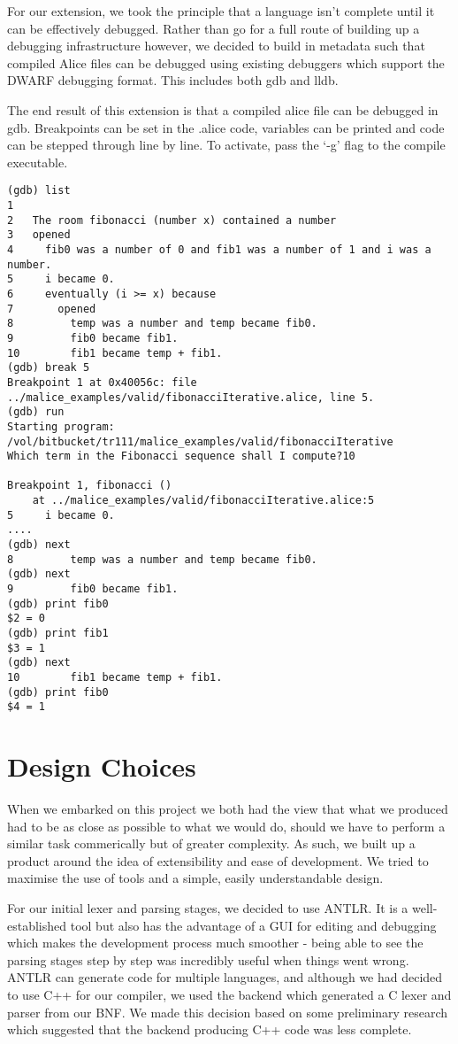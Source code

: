 \documentclass[a4wide, 11pt]{article}
\begin{document}
For our extension, we took the principle that a language isn't complete until it can be effectively debugged. Rather than go for a full route of building up a debugging infrastructure however, we decided to build in metadata such that compiled Alice files can be debugged using existing debuggers which support the DWARF debugging format. This includes both gdb and lldb.

The end result of this extension is that a compiled alice file can be debugged in gdb. Breakpoints can be set in the .alice code, variables can be printed and code can be stepped through line by line. To activate, pass the `-g' flag to the compile executable.

\begin{verbatim}
(gdb) list
1   
2   The room fibonacci (number x) contained a number
3   opened
4     fib0 was a number of 0 and fib1 was a number of 1 and i was a number.
5     i became 0.
6     eventually (i >= x) because
7       opened
8         temp was a number and temp became fib0.
9         fib0 became fib1.
10        fib1 became temp + fib1.
(gdb) break 5
Breakpoint 1 at 0x40056c: file ../malice_examples/valid/fibonacciIterative.alice, line 5.
(gdb) run
Starting program: /vol/bitbucket/tr111/malice_examples/valid/fibonacciIterative 
Which term in the Fibonacci sequence shall I compute?10

Breakpoint 1, fibonacci ()
    at ../malice_examples/valid/fibonacciIterative.alice:5
5     i became 0.
....
(gdb) next
8         temp was a number and temp became fib0.
(gdb) next
9         fib0 became fib1.
(gdb) print fib0
$2 = 0
(gdb) print fib1
$3 = 1
(gdb) next
10        fib1 became temp + fib1.
(gdb) print fib0
$4 = 1
\end{verbatim}


\section{Design Choices}

When we embarked on this project we both had the view that what we produced had to be as close as possible to what we would do, should we have to perform a similar task commerically but of greater complexity. As such, we built up a product around the idea of extensibility and ease of development. We tried to maximise the use of tools and a simple, easily understandable design.

For our initial lexer and parsing stages, we decided to use ANTLR. It is a well-established tool but also has the advantage of a GUI for editing and debugging which makes the development process much smoother - being able to see the parsing stages step by step was incredibly useful when things went wrong. ANTLR can generate code for multiple languages, and although we had decided to use C++ for our compiler, we used the backend which generated a C lexer and parser from our BNF. We made this decision based on some preliminary research which suggested that the backend producing C++ code was less complete. 
\end{document}
